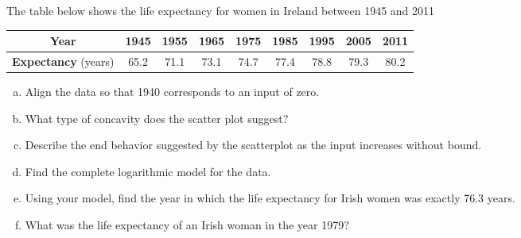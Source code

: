 \documentclass[notes]{subfiles}
\begin{document}
		\begin{ex}
			The table below shows the life expectancy for women in Ireland between 1945 and 2011
			\begin{center}
				{\renewcommand{\arraystretch}{1.2}
				\begin{tabular}{|c||c|c|c|c|c|c|c|c|}\hline
					\textbf{Year} & 1945 & 1955 & 1965 & 1975 & 1985 & 1995 & 2005 & 2011\\ \hline
					\textbf{Expectancy} (years) & 65.2 & 71.1 & 73.1 & 74.7 & 77.4 & 78.8 & 79.3 & 80.2\\ \hline
				\end{tabular}
				}
			\end{center}
			\begin{enumerate}[(a)]
				\item Align the data so that 1940 corresponds to an input of zero.
				\item What type of concavity does the scatter plot suggest?
				\item Describe the end behavior suggested by the scatterplot as the input increases without bound.
					\newpage

				\item Find the complete logarithmic model for the data.

				\item Using your model, find the year in which the life expectancy for Irish women was exactly 76.3 years.
				\item What was the life expectancy of an Irish woman in the year 1979?
			\end{enumerate}
		\end{ex}
	\clearpage
\end{document}
